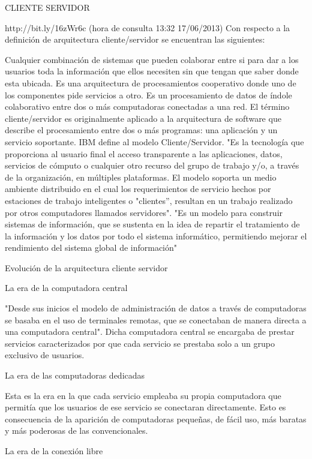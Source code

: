 CLIENTE SERVIDOR

http://bit.ly/16zWr6c (hora de consulta 13:32 17/06/2013)
Con respecto a la definición de arquitectura cliente/servidor se encuentran las siguientes:

    Cualquier combinación de sistemas que pueden colaborar entre si para dar a los usuarios toda la información que 
     ellos necesiten sin que tengan que saber donde esta ubicada.
    Es una arquitectura de procesamientos cooperativo donde uno de los componentes pide servicios a otro.
    Es un procesamiento de datos de índole colaborativo entre dos o más computadoras conectadas a una red.
    El término cliente/servidor es originalmente aplicado a la arquitectura de software que describe el procesamiento 
     entre dos o más programas: una aplicación y un servicio soportante.
    IBM define al modelo Cliente/Servidor. "Es la tecnología que proporciona al usuario final el acceso transparente a las 
     aplicaciones, datos, servicios de cómputo o cualquier otro recurso del grupo de trabajo y/o, a través de la organización, 
     en múltiples plataformas. El modelo soporta un medio ambiente distribuido en el cual los requerimientos de servicio hechos 
     por estaciones de trabajo inteligentes o "clientes'', resultan en un trabajo realizado por otros computadores llamados 
     servidores".
    "Es un modelo para construir sistemas de información, que se sustenta en la idea de repartir el tratamiento de la información y 
    los datos por todo el sistema informático, permitiendo mejorar el rendimiento del sistema global de información"
    
Evolución de la arquitectura cliente servidor

La era de la computadora central

"Desde sus inicios el modelo de administración de datos a través de computadoras se basaba en el uso de terminales remotas, 
que se conectaban de manera directa a una computadora central". Dicha computadora central se encargaba de prestar servicios 
caracterizados por que cada servicio se prestaba solo a un grupo exclusivo de usuarios.

La era de las computadoras dedicadas

Esta es la era en la que cada servicio empleaba su propia computadora que permitía que los usuarios de ese servicio se 
conectaran directamente. Esto es consecuencia de la aparición de computadoras pequeñas, de fácil uso, más baratas y más 
poderosas de las convencionales.

La era de la conexión libre

